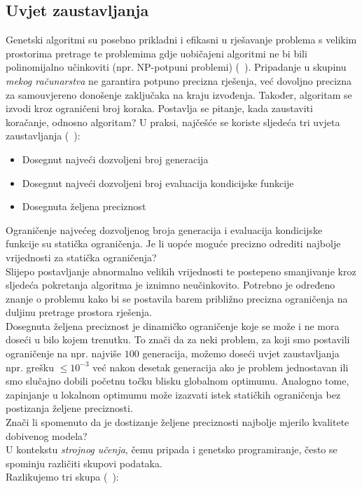\subsection{Uvjet zaustavljanja}
Genetski algoritmi su posebno prikladni i efikasni u rješavanje problema s velikim prostorima pretrage te problemima gdje uobičajeni algoritmi ne bi bili polinomijalno učinkoviti (npr. NP-potpuni problemi) (~\cite{brassard1988algorithmics}).
Pripadanje u skupinu \emph{mekog računarstva} ne garantira potpuno precizna rješenja, već dovoljno precizna za samouvjereno donošenje zaključaka na kraju izvođenja.
Također, algoritam se izvodi kroz ograničeni broj koraka.
Postavlja se pitanje, kada zaustaviti koračanje, odnosno algoritam?
U praksi, najčešće se koriste sljedeća tri uvjeta zaustavljanja (~\cite{ga_stopping_criteria}):
\begin{itemize}
	\item Dosegnut najveći dozvoljeni broj generacija
	\item Dosegnut najveći dozvoljeni broj evaluacija kondicijske funkcije
	\item Dosegnuta željena preciznost
\end{itemize}
Ograničenje najvećeg dozvoljenog broja generacija i evaluacija kondicijske funkcije su statička ograničenja.
Je li uopće moguće precizno odrediti najbolje vrijednosti za statička ograničenja? \\
Slijepo postavljanje abnormalno velikih vrijednosti te postepeno smanjivanje kroz sljedeća pokretanja algoritma je iznimno neučinkovito.
Potrebno je određeno znanje o problemu kako bi se postavila barem približno precizna ograničenja na duljinu pretrage prostora rješenja. \\
Dosegnuta željena preciznost je dinamičko ograničenje koje se može i ne mora doseći u bilo kojem trenutku.
To znači da za neki problem, za koji smo postavili ograničenje na npr. najviše $100$ generacija, možemo doseći uvjet zaustavljanja npr. grešku $\leq 10^{-3}$ već nakon desetak generacija ako je problem jednostavan ili smo slučajno dobili početnu točku blisku globalnom optimumu.
Analogno tome, zapinjanje u lokalnom optimumu može izazvati istek statičkih ograničenja bez postizanja željene preciznosti. \\
Znači li spomenuto da je dostizanje željene preciznosti najbolje mjerilo kvalitete dobivenog modela? \\
U kontekstu \emph{strojnog učenja}, čemu pripada i genetsko programiranje, često se spominju različiti skupovi podataka. \\
Razlikujemo tri skupa (~\cite{datasets}):

